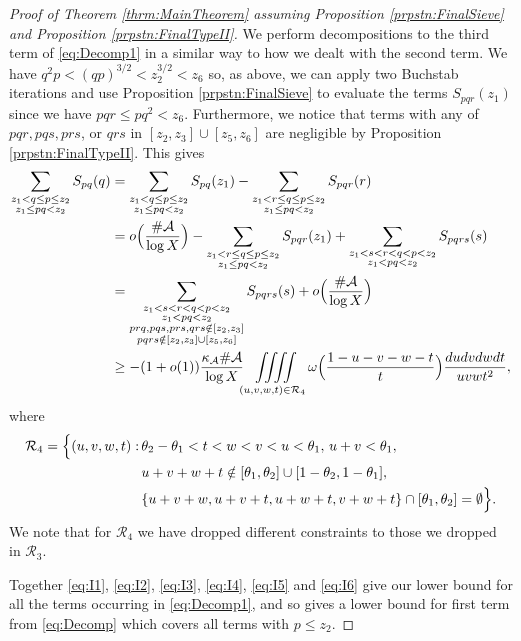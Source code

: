 \documentclass[10pt]{amsart}
\theoremstyle{plain}
\numberwithin{sblmm}{thrm}
\numberwithin{equation}{section}
\begin{document}
\begin{proof}[Proof of Theorem \ref{thrm:MainTheorem} assuming Proposition \ref{prpstn:FinalSieve} and Proposition \ref{prpstn:FinalTypeII}]
We perform decompositions to the third term of \eqref{eq:Decomp1} in a similar way to how we dealt with the second term. We have $q^2 p<(q p)^{3/2}< z_2^{3/2}< z_6$ so, as above, we can apply two Buchstab iterations and use Proposition \ref{prpstn:FinalSieve} to evaluate the terms $S_{p q r}(z_1)$ since we have $p q r\le p q^2<z_6$. Furthermore, we notice that terms with any of $p q r, p q s, p r s$, or $q r s$ in $[z_2,z_3]\cup[z_5,z_6]$ are negligible by Proposition \ref{prpstn:FinalTypeII}. %
This gives
%
\begingroup
\allowdisplaybreaks
\begin{align}
\sum_{\substack{z_1<q\le p\le z_2\\ z_1\le p q<z_2}}S_{p q}(q)%
&=\sum_{\substack{z_1<q\le p\le z_2\\ z_1\le p q<z_2}}S_{p q}(z_1)-\sum_{\substack{z_1<r\le q\le p\le z_2\\ z_1\le p q<z_2}}S_{p q r}(r)\nonumber\\%
&=o\Bigl(\frac{\#\mathcal{A}}{\log{X}}\Bigr)-\sum_{\substack{z_1<r\le q\le p\le z_2\\ z_1\le p q<z_2}}S_{p q r}(z_1)%
%
+\sum_{\substack{z_1<s<r<q<p<z_2\\ z_1<p q<z_2}}S_{p q r s}(s)\nonumber\\
&=\sum_{\substack{z_1<s<r<q<p<z_2\\ z_1<p q<z_2\\  p r q, p q s, p r s, q r s\notin[z_2,z_3] \\ p q r s\notin[z_2,z_3]\cup[z_5,z_6]}}S_{p q r s}(s)+o\Bigl(\frac{\#\mathcal{A}{}}{\log{X}}\Bigr)\nonumber\\
&\ge-(1+o(1))\frac{\kappa_{\mathcal{A}}\#\mathcal{A}{}}{\log{X}}
\iiiint\limits_{(u,v,w,t)\in\mathcal{R}_4}\omega\Bigl(\frac{1-u-v-w-t}{t}\Bigr)\frac{d u d v d w d t}{u v w t^2},\label{eq:I6}
\end{align}
\endgroup
%
where
%
\begin{align*}
\mathcal{R}_4=\Bigl\{(u,v,w,t):\, &\theta_2-\theta_1<t<w<v<u<\theta_1,\,u+v<\theta_1,\\
&u+v+w+t\notin[\theta_1,\theta_2]\cup[1-\theta_2,1-\theta_1],\\
&\{u+v+w,u+v+t,u+w+t,v+w+t\}\cap[\theta_1,\theta_2]=\emptyset\Bigr\}.
\end{align*}
%
We note that for $\mathcal{R}_4$ we have dropped different constraints to those we dropped in $\mathcal{R}_3$. 

Together \eqref{eq:I1}, \eqref{eq:I2}, \eqref{eq:I3}, \eqref{eq:I4}, \eqref{eq:I5} and \eqref{eq:I6} give our lower bound for all the terms occurring in \eqref{eq:Decomp1}, and so gives a lower bound for first term from \eqref{eq:Decomp} which covers all terms with $p\le z_2$. 


\end{proof}
\end{document}
